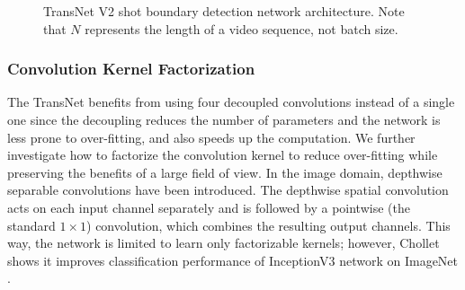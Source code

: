 \begin{figure}
    \caption[TransNet V2 shot boundary detection network architecture]{TransNet V2 shot boundary detection network architecture. Note that $N$ represents the length of a video sequence, not batch size.}
    \label{fig:nn_architecture_v2}
\end{figure}


\subsubsection{Convolution Kernel Factorization}
The TransNet benefits from using four decoupled convolutions instead of a single one since the decoupling reduces the number of parameters and the network is less prone to over-fitting, and also speeds up the computation. We further investigate how to factorize the convolution kernel to reduce over-fitting while preserving the benefits of a large field of view. In the image domain, depthwise separable convolutions have been introduced. The depthwise spatial convolution acts on each input channel separately and is followed by a pointwise (the standard $1\times 1$) convolution, which combines the resulting output channels. This way, the network is limited to learn only factorizable kernels; however, Chollet \cite{Chollet_2017_CVPR} shows it improves classification performance of InceptionV3 network \cite{Szegedy_2016_InceptionV3} on ImageNet \cite{imagenet}.

